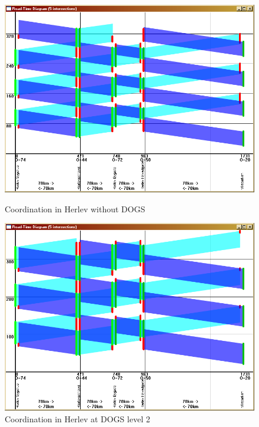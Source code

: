 \begin{figure}[ht]

    \begin{minipage}[b]{0.5\linewidth}
    
\begin{center}
\includegraphics[scale=0.22]{coord_p1_herlev_c80.PNG} 
\end{center}
\caption{Coordination in Herlev without DOGS}
\label{fig:coord_p1_herlev_c80}

    \end{minipage}
    \hspace{0.5cm}
    \begin{minipage}[b]{0.5\linewidth}

\begin{center}
\includegraphics[scale=0.22]{coord_p1_herlev_c100.PNG} 
\end{center}
\caption{Coordination in Herlev at DOGS level 2}
\label{fig:coord_p1_herlev_c100}

    \end{minipage}
    
\end{figure}

